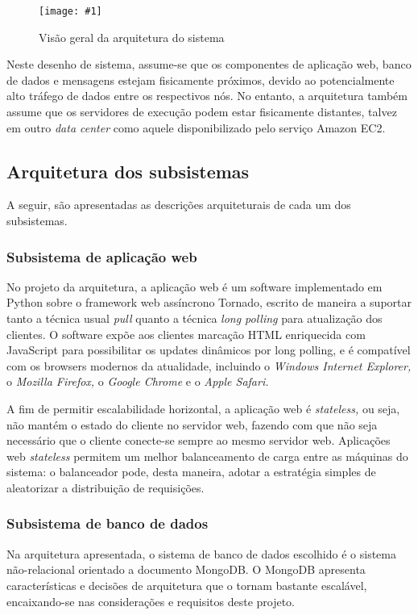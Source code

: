 \documentclass[ruledheader, 12pt]{abnt}
\newcommand{\figcustom}[4]{\par
	\begin{figure}[#3]
		\centering
		\texttt{[image: \#1]}
		\caption{\label{fig:#1}#2}
	\end{figure}
\par}
\begin{document}
\afterpage{\clearpage}
\figcustom{architecture}{Visão geral da arquitetura do sistema}{bp}{.9}

Neste desenho de sistema, assume-se que os componentes de aplicação web, banco de dados e mensagens estejam fisicamente próximos, devido ao potencialmente alto tráfego de dados entre os respectivos nós. No entanto, a arquitetura também assume que os servidores de execução podem estar fisicamente distantes, talvez em outro \emph{data center} como aquele disponibilizado pelo serviço Amazon EC2.

\subsection{Arquitetura dos subsistemas}

A seguir, são apresentadas as descrições arquiteturais de cada um dos subsistemas.

\subsubsection{Subsistema de aplicação web}

No projeto da arquitetura, a aplicação web é um software implementado em Python sobre o framework web assíncrono Tornado, escrito de maneira a suportar tanto a técnica usual \emph{pull} quanto a técnica \emph{long polling} para atualização dos clientes. O software expõe aos clientes marcação HTML enriquecida com JavaScript para possibilitar os updates dinâmicos por long polling, e é compatível com os browsers modernos da atualidade, incluindo o \emph{Windows Internet Explorer,} o \emph{Mozilla Firefox,} o \emph{Google Chrome} e o \emph{Apple Safari.}

A fim de permitir escalabilidade horizontal, a aplicação web é \emph{stateless,} ou seja, não mantém o estado do cliente no servidor web, fazendo com que não seja necessário que o cliente conecte-se sempre ao mesmo servidor web. Aplicações web \emph{stateless} permitem um melhor balanceamento de carga entre as máquinas do sistema: o balanceador pode, desta maneira, adotar a estratégia simples de aleatorizar a distribuição de requisições.

\subsubsection{Subsistema de banco de dados}

Na arquitetura apresentada, o sistema de banco de dados escolhido é o sistema não-relacional orientado a documento MongoDB. O MongoDB apresenta características e decisões de arquitetura que o tornam bastante escalável, encaixando-se nas considerações e requisitos deste projeto.
\end{document}
